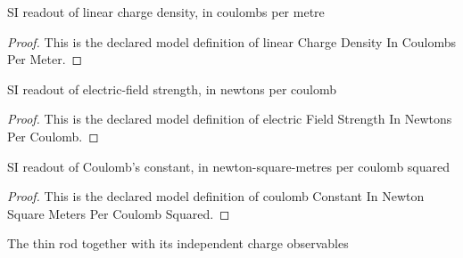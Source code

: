 \begin{definition}
  \label{def:physics:phyx-mini-0835:phyxminiproblems-problemphyxmini0835-linearchargedensityincoulombspermeter}
  SI readout of linear charge density, in coulombs per metre
\end{definition}
\begin{proof}
  This is the declared model definition of linear Charge Density In Coulombs Per Meter.
\end{proof}
\begin{definition}
  \label{def:physics:phyx-mini-0835:phyxminiproblems-problemphyxmini0835-electricfieldstrengthinnewtonspercoulomb}
  SI readout of electric-field strength, in newtons per coulomb
\end{definition}
\begin{proof}
  This is the declared model definition of electric Field Strength In Newtons Per Coulomb.
\end{proof}
\begin{definition}
  \label{def:physics:phyx-mini-0835:phyxminiproblems-problemphyxmini0835-coulombconstantinnewtonsquaremeterspercoulombsquared}
  SI readout of Coulomb's constant, in newton-square-metres per coulomb squared
\end{definition}
\begin{proof}
  This is the declared model definition of coulomb Constant In Newton Square Meters Per Coulomb Squared.
\end{proof}
\begin{definition}
  \label{def:physics:phyx-mini-0835:phyxminiproblems-problemphyxmini0835-thinuniformchargedrod}
  The thin rod together with its independent charge observables
\end{definition}
